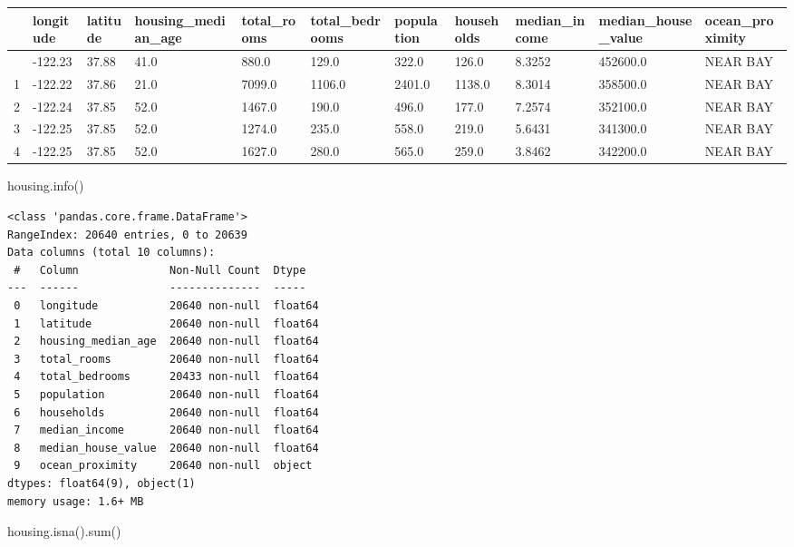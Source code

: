 \documentclass[
  letterpaper,
  DIV=11,
  numbers=noendperiod]{scrartcl}
\newenvironment{Shaded}{\begin{snugshade}}{\end{snugshade}}
\newcommand{\BuiltInTok}[1]{\textcolor[rgb]{0.00,0.23,0.31}{#1}}
\newcommand{\NormalTok}[1]{\textcolor[rgb]{0.00,0.23,0.31}{#1}}
\begin{document}
\begin{longtable}[]{@{}lllllllllll@{}}
\toprule\noalign{}
& longitude & latitude & housing\_median\_age & total\_rooms &
total\_bedrooms & population & households & median\_income &
median\_house\_value & ocean\_proximity \\
\midrule\noalign{}
\endhead
\bottomrule\noalign{}
\endlastfoot
0 & -122.23 & 37.88 & 41.0 & 880.0 & 129.0 & 322.0 & 126.0 & 8.3252 &
452600.0 & NEAR BAY \\
1 & -122.22 & 37.86 & 21.0 & 7099.0 & 1106.0 & 2401.0 & 1138.0 & 8.3014
& 358500.0 & NEAR BAY \\
2 & -122.24 & 37.85 & 52.0 & 1467.0 & 190.0 & 496.0 & 177.0 & 7.2574 &
352100.0 & NEAR BAY \\
3 & -122.25 & 37.85 & 52.0 & 1274.0 & 235.0 & 558.0 & 219.0 & 5.6431 &
341300.0 & NEAR BAY \\
4 & -122.25 & 37.85 & 52.0 & 1627.0 & 280.0 & 565.0 & 259.0 & 3.8462 &
342200.0 & NEAR BAY \\
\end{longtable}

\begin{Shaded}
\begin{Highlighting}[]
\NormalTok{housing.info()}
\end{Highlighting}
\end{Shaded}

\begin{verbatim}
<class 'pandas.core.frame.DataFrame'>
RangeIndex: 20640 entries, 0 to 20639
Data columns (total 10 columns):
 #   Column              Non-Null Count  Dtype  
---  ------              --------------  -----  
 0   longitude           20640 non-null  float64
 1   latitude            20640 non-null  float64
 2   housing_median_age  20640 non-null  float64
 3   total_rooms         20640 non-null  float64
 4   total_bedrooms      20433 non-null  float64
 5   population          20640 non-null  float64
 6   households          20640 non-null  float64
 7   median_income       20640 non-null  float64
 8   median_house_value  20640 non-null  float64
 9   ocean_proximity     20640 non-null  object 
dtypes: float64(9), object(1)
memory usage: 1.6+ MB
\end{verbatim}

\begin{Shaded}
\begin{Highlighting}[]
\NormalTok{housing.isna().}\BuiltInTok{sum}\NormalTok{()}
\end{Highlighting}
\end{Shaded}
\end{document}
